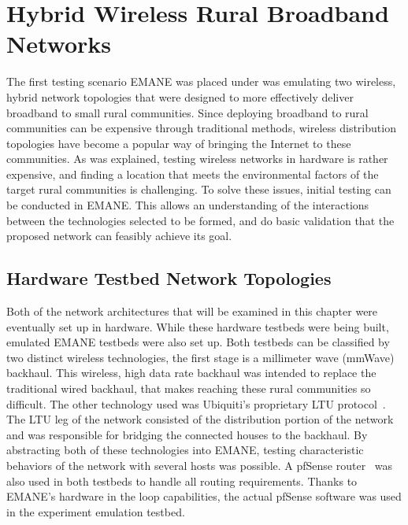 \chapter{Hybrid Wireless Rural Broadband Networks}
\label{chapter3}
The first testing scenario EMANE was placed under was emulating two wireless, hybrid network topologies that were designed to more effectively deliver broadband to small rural communities.
Since deploying broadband to rural communities can be expensive through traditional methods, wireless distribution topologies have become a popular way of bringing the Internet to these communities.
As was explained, testing wireless networks in hardware is rather expensive, and finding a location that meets the environmental factors of the target rural communities is challenging.
To solve these issues, initial testing can be conducted in EMANE. This allows an understanding of the interactions between the technologies selected to be formed, and do basic validation that the proposed network can feasibly achieve its goal.

\section{Hardware Testbed Network Topologies}
Both of the network architectures that will be examined in this chapter were eventually set up in hardware.
While these hardware testbeds were being built, emulated EMANE testbeds were also set up.
Both testbeds can be classified by two distinct wireless technologies, the first stage is a millimeter wave (mmWave) backhaul.
This wireless, high data rate backhaul was intended to replace the traditional wired backhaul, that makes reaching these rural communities so difficult.
The other technology used was Ubiquiti's proprietary LTU protocol~\cite{ltu}.
The LTU leg of the network consisted of the distribution portion of the network and was responsible for bridging the connected houses to the backhaul.
By abstracting both of these technologies into EMANE, testing characteristic behaviors of the network with several hosts was possible.
A pfSense router~\cite{pfsense} was also used in both testbeds to handle all routing requirements.
Thanks to EMANE's hardware in the loop capabilities, the actual pfSense software was used in the experiment emulation testbed.

